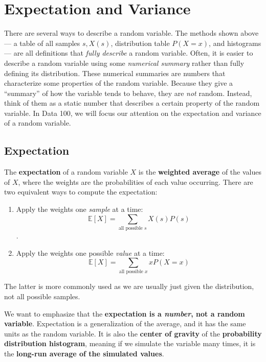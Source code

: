 \documentclass[
  letterpaper,
  DIV=11,
  numbers=noendperiod]{scrreprt}
\providecommand{\tightlist}{%
  \setlength{\itemsep}{0pt}\setlength{\parskip}{0pt}}\usepackage{longtable,booktabs,array}
\begin{document}
\section{Expectation and Variance}\label{expectation-and-variance}

There are several ways to describe a random variable. The methods shown
above --- a table of all samples \(s, X(s)\), distribution table
\(P(X=x)\), and histograms --- are all definitions that \emph{fully
describe} a random variable. Often, it is easier to describe a random
variable using some \emph{numerical summary} rather than fully defining
its distribution. These numerical summaries are numbers that
characterize some properties of the random variable. Because they give a
``summary'' of how the variable tends to behave, they are \emph{not}
random. Instead, think of them as a static number that describes a
certain property of the random variable. In Data 100, we will focus our
attention on the expectation and variance of a random variable.

\subsection{Expectation}\label{expectation}

The \textbf{expectation} of a random variable \(X\) is the
\textbf{weighted average} of the values of \(X\), where the weights are
the probabilities of each value occurring. There are two equivalent ways
to compute the expectation:

\begin{enumerate}
\def\labelenumi{\arabic{enumi}.}
\tightlist
\item
  Apply the weights one \emph{sample} at a time:
  \[\mathbb{E}[X] = \sum_{\text{all possible } s} X(s) P(s)\].
\item
  Apply the weights one possible \emph{value} at a time:
  \[\mathbb{E}[X] = \sum_{\text{all possible } x} x P(X=x)\]
\end{enumerate}

The latter is more commonly used as we are usually just given the
distribution, not all possible samples.

We want to emphasize that the \textbf{expectation is a \emph{number},
not a random variable}. Expectation is a generalization of the average,
and it has the same units as the random variable. It is also the
\textbf{center of gravity} of the \textbf{probability distribution
histogram}, meaning if we simulate the variable many times, it is the
\textbf{long-run average of the simulated values}.
\end{document}
